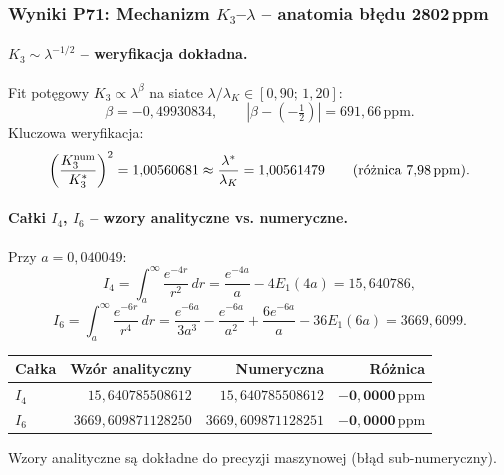 \subsubsection{Wyniki P71: Mechanizm $K_3$--$\lambda$ -- anatomia b\l{}\k{e}du 2802\,ppm}
\label{app:F-P71}

\paragraph{$K_3 \sim \lambda^{-1/2}$ -- weryfikacja dok\l{}adna.}
Fit pot\k{e}gowy $K_3 \propto \lambda^\beta$ na siatce $\lambda/\lambda_K \in [0{,}90;\,1{,}20]$:
\[
  \beta = -0{,}49930834, \qquad |\beta - (-\tfrac{1}{2})| = 691{,}66\,\mathrm{ppm}.
\]
Kluczowa weryfikacja:
\[
  \left(\frac{K_3^{\rm num}}{K_3^*}\right)^2 = 1{,}00560681
  \approx \frac{\lambda^*}{\lambda_K} = 1{,}00561479
  \qquad (\text{r\'o\.znica } 7{,}98\,\mathrm{ppm}).
\]

\paragraph{Ca\l{}ki $I_4$, $I_6$ -- wzory analityczne vs. numeryczne.}
Przy $a = 0{,}040049$:
\[
  I_4 = \int_a^\infty \frac{e^{-4r}}{r^2}\,dr
      = \frac{e^{-4a}}{a} - 4E_1(4a)
      = 15{,}640786,
\]
\[
  I_6 = \int_a^\infty \frac{e^{-6r}}{r^4}\,dr
      = \frac{e^{-6a}}{3a^3} - \frac{e^{-6a}}{a^2} + \frac{6e^{-6a}}{a} - 36E_1(6a)
      = 3669{,}6099.
\]
\begin{center}
\begin{tabular}{l|r|r|r}
\hline
Ca\l{}ka & Wz\'or analityczny & Numeryczna & R\'o\.znica \\
\hline
$I_4$ & $15{,}640785508612$ & $15{,}640785508612$ & $\mathbf{-0{,}0000\,\mathrm{ppm}}$ \\
$I_6$ & $3669{,}609871128250$ & $3669{,}609871128251$ & $\mathbf{-0{,}0000\,\mathrm{ppm}}$ \\
\hline
\end{tabular}
\end{center}
Wzory analityczne s\k{a} dok\l{}adne do precyzji maszynowej (b\l{}\k{a}d sub-numeryczny).


